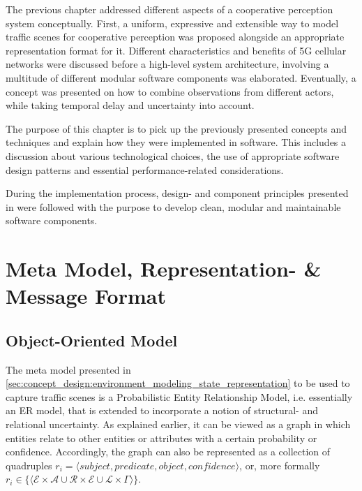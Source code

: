 The previous chapter addressed different aspects of a cooperative perception system conceptually. First, a uniform, expressive and extensible way to model traffic scenes for cooperative perception was proposed alongside an appropriate representation format for it. Different characteristics and benefits of 5G cellular networks were discussed before a high-level system architecture, involving a multitude of different modular software components was elaborated. Eventually, a concept was presented on how to combine observations from different actors, while taking temporal delay and uncertainty into account. 
\par
\bigskip
 
The purpose of this chapter is to pick up the previously presented concepts and techniques and explain how they were implemented in software. This includes a discussion about various technological choices, the use of appropriate software design patterns and essential performance-related considerations.
\par
\bigskip

During the implementation process, design- and component principles presented in \cite{Martin2017} were followed with the purpose to develop clean, modular and maintainable software components.

\section{Meta Model, Representation- \& Message Format}
\label{sec:implementation:meta_model_representation_message_format}

\subsection{Object-Oriented Model}
\label{subsec:implementation:object_oriented_model}
The meta model presented in \autoref{sec:concept_design:environment_modeling_state_representation} to be used to capture traffic scenes is a Probabilistic Entity Relationship Model, i.e. essentially an ER model, that is extended to incorporate a notion of structural- and relational uncertainty. As explained earlier, it can be viewed as a graph in which entities relate to other entities or attributes with a certain probability or confidence. Accordingly, the graph can also be represented as a collection of quadruples $r_i = \langle \textit{subject}, \textit{predicate}, \textit{object}, \textit{confidence} \rangle$, or, more formally $r_i \in \{ \langle \mathcal{E} \times \mathcal{A} \cup \mathcal{R} \times \mathcal{E} \cup \mathcal{L} \times \Gamma \rangle \}$. 

